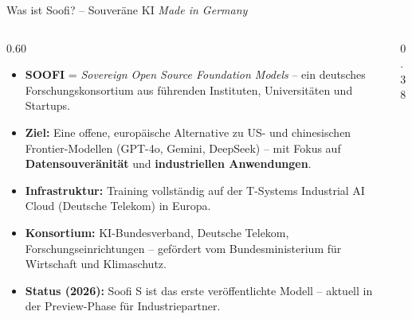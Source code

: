 \documentclass[aspectratio=1610, xcolor=dvipsnames, 9pt]{beamer}
\begin{document}
\begin{frame}{Was ist Soofi? -- Souveräne KI \emph{Made in Germany}}
  \begin{columns}
    \begin{column}{0.60\textwidth}
      \begin{itemize}
        \item \textbf{SOOFI} = \emph{Sovereign Open Source Foundation Models} -- ein deutsches Forschungskonsortium aus führenden Instituten, Universitäten und Startups.
        \item \textbf{Ziel:} Eine offene, europäische Alternative zu US- und chinesischen Frontier-Modellen (GPT-4o, Gemini, DeepSeek) -- mit Fokus auf \textbf{Datensouveränität} und \textbf{industriellen Anwendungen}.
        \item \textbf{Infrastruktur:} Training vollständig auf der T-Systems Industrial AI Cloud (Deutsche Telekom) in Europa.
        \item \textbf{Konsortium:} KI-Bundesverband, Deutsche Telekom, Forschungseinrichtungen -- gefördert vom Bundesministerium für Wirtschaft und Klimaschutz.
        \item \textbf{Status (2026):} Soofi S ist das erste veröffentlichte Modell -- aktuell in der Preview-Phase für Industriepartner.
      \end{itemize}
    \end{column}
    \begin{column}{0.38\textwidth}
      \centering
    \end{column}
  \end{columns}
\end{frame}
\end{document}
